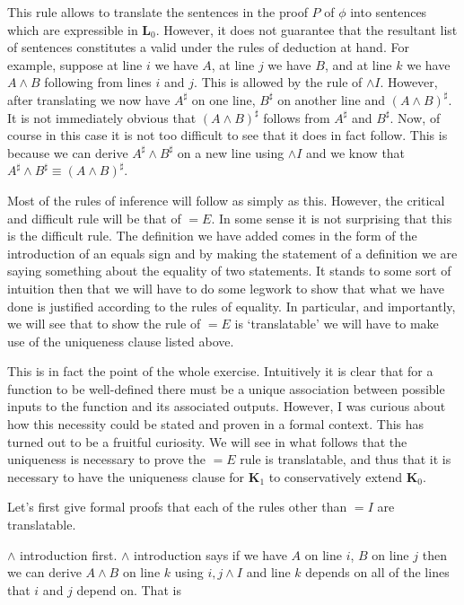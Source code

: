 \documentclass[12pt]{article}
\newcommand{\bv}[1]{\boldsymbol{#1}}
\begin{document}
This rule allows to translate the sentences in the proof $P$ of $\phi$ into sentences which are expressible in $\bv{L}_0$. However, it does not guarantee that the resultant list of sentences constitutes a valid under the rules of deduction at hand. For example, suppose at line $i$ we have $A$, at line $j$ we have $B$, and at line $k$ we have $A \land B$ following from lines $i$ and $j$. This is allowed by the rule of $\land I$. However, after translating we now have $A^{\sharp}$ on one line, $B^{\sharp}$ on another line and $\left(A \land B\right)^{\sharp}$. It is not immediately obvious that $\left(A \land B\right)^{\sharp}$ follows from $A^{\sharp}$ and $B^{\sharp}$. Now, of course in this case it is not too difficult to see that it does in fact follow. This is because we can derive $A^{\sharp} \land B^{\sharp}$ on a new line using $\land I$ and we know that $A^{\sharp} \land B^{\sharp} \equiv \left(A \land B\right)^{\sharp}$. 

Most of the rules of inference will follow as simply as this. However, the critical and difficult rule will be that of $= E$. In some sense it is not surprising that this is the difficult rule. The definition we have added comes in the form of the introduction of an equals sign and by making the statement of a definition we are saying something about the equality of two statements. It stands to some sort of intuition then that we will have to do some legwork to show that what we have done is justified according to the rules of equality. In particular, and importantly, we will see that to show the rule of $= E$ is `translatable' we will have to make use of the uniqueness clause listed above.

This is in fact the point of the whole exercise. Intuitively it is clear that for a function to be well-defined there must be a unique association between possible inputs to the function and its associated outputs. However, I was curious about how this necessity could be stated and proven in a formal context. This has turned out to be a fruitful curiosity. We will see in what follows that the uniqueness is necessary to prove the $=E$ rule is translatable, and thus that it is necessary to have the uniqueness clause for $\bv{K}_1$ to conservatively extend $\bv{K}_0$.

Let's first give formal proofs that each of the rules other than $=I$ are translatable.

$\land$ introduction first. $\land$ introduction says if we have $A$ on line $i$, $B$ on line $j$ then we can derive $A \land B$ on line $k$ using $i,j \land I$ and line $k$ depends on all of the lines that $i$ and $j$ depend on. That is
\end{document}
